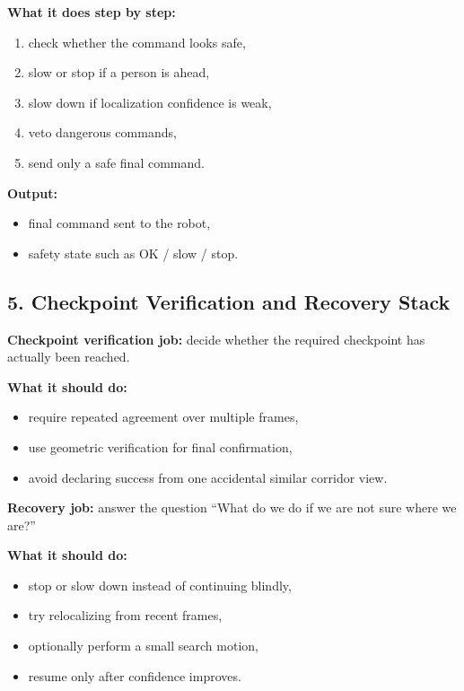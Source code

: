 \documentclass[11pt,a4paper]{article}
\begin{document}
\textbf{What it does step by step:}

\begin{enumerate}[nosep]
  \item check whether the command looks safe,
  \item slow or stop if a person is ahead,
  \item slow down if localization confidence is weak,
  \item veto dangerous commands,
  \item send only a safe final command.
\end{enumerate}

\textbf{Output:}

\begin{itemize}[nosep]
  \item final command sent to the robot,
  \item safety state such as OK / slow / stop.
\end{itemize}


\subsection{5. Checkpoint Verification and Recovery Stack}

\textbf{Checkpoint verification job:} decide whether the required checkpoint has actually been reached.

\textbf{What it should do:}

\begin{itemize}[nosep]
  \item require repeated agreement over multiple frames,
  \item use geometric verification for final confirmation,
  \item avoid declaring success from one accidental similar corridor view.
\end{itemize}

\textbf{Recovery job:} answer the question ``What do we do if we are not sure where we are?''

\textbf{What it should do:}

\begin{itemize}[nosep]
  \item stop or slow down instead of continuing blindly,
  \item try relocalizing from recent frames,
  \item optionally perform a small search motion,
  \item resume only after confidence improves.
\end{itemize}
\end{document}
